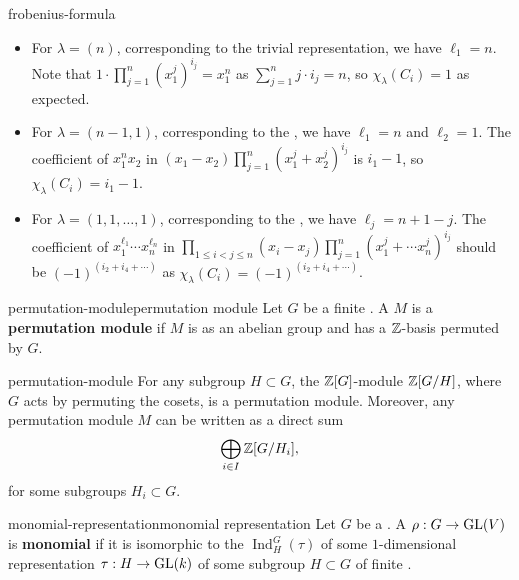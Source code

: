 \begin{example}{frobenius-formula}
    \begin{itemize}
        \item For $\lambda = (n)$, corresponding to the trivial representation, we have $\ell_1 = n$. Note that $1 \cdot \prod_{j = 1}^{n} (x_1^j)^{i_j} = x_1^n$ as $\sum_{j = 1}^{n} j \cdot i_j = n$, so $\chi_\lambda(C_i) = 1$ as expected.
        \item For $\lambda = (n - 1, 1)$, corresponding to the , we have $\ell_1 = n$ and $\ell_2 = 1$. The coefficient of $x_1^n x_2$ in $(x_1 - x_2) \prod_{j = 1}^{n} (x_1^j + x_2^j)^{i_j}$ is $i_1 - 1$, so $\chi_\lambda(C_i) = i_1 - 1$. %
        \item For $\lambda = (1, 1, \ldots, 1)$, corresponding to the , we have $\ell_j = n + 1 - j$. The coefficient of $x_1^{\ell_1} \cdots x_n^{\ell_n}$ in $\prod_{1 \le i < j \le n} (x_i - x_j) \prod_{j = 1}^{n} (x_1^j + \cdots x_n^j)^{i_j}$ should be $(-1)^{(i_2 + i_4 + \cdots)}$ as $\chi_\lambda(C_i) = (-1)^{(i_2 + i_4 + \cdots)}$.
    \end{itemize}
\end{example}

\begin{topic}{permutation-module}{permutation module}
    Let $G$ be a finite . A  $M$ is a \textbf{permutation module} if $M$ is  as an abelian group and has a $\mathbb{Z}$-basis permuted by $G$.
\end{topic}

\begin{example}{permutation-module}
    For any subgroup $H \subset G$, the $\mathbb{Z}[G]$-module $\mathbb{Z}[G/H]$, where $G$ acts by permuting the cosets, is a permutation module. Moreover, any permutation module $M$ can be written as a direct sum
    \[ \bigoplus_{i \in I} \mathbb{Z}[G/H_i] , \]
    for some subgroups $H_i \subset G$.
\end{example}

\begin{topic}{monomial-representation}{monomial representation}
    Let $G$ be a . A  $\rho : G \to \textup{GL}(V)$ is \textbf{monomial} if it is isomorphic to the  $\operatorname{Ind}_H^G(\tau)$ of some $1$-dimensional representation $\tau : H \to \textup{GL}(k)$ of some subgroup $H \subset G$ of finite .
\end{topic}

